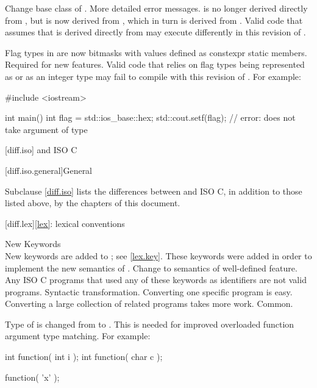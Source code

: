 \change
Change base class of .
\rationale
More detailed error messages.
\effect
{} is no longer derived directly from
, but is now derived from ,
which in turn is derived from . Valid \CppIII{} code
that assumes that  is derived directly from
 may execute differently in this revision of \Cpp{}.

\change
Flag types in  are now bitmasks with values
defined as constexpr static members.
\rationale
Required for new features.
\effect
Valid \CppIII{} code that relies on  flag types being
represented as  or as an integer type may fail to compile
with this revision of \Cpp{}. For example:
\begin{codeblock}
#include <iostream>

int main() {
  int flag = std::ios_base::hex;
  std::cout.setf(flag);         // error:  does not take argument of type 
}
\end{codeblock}

[diff.iso]{\Cpp{} and ISO C}

[diff.iso.general]{General}

\pnum
{}%
Subclause \ref{diff.iso} lists the differences between \Cpp{} and ISO C,
in addition to those listed above,
by the chapters of this document.

[diff.lex]{\ref{lex}: lexical conventions}

\change
New Keywords\\
New keywords are added to \Cpp{};
see \ref{lex.key}.
\rationale
These keywords were added in order to implement the new
semantics of \Cpp{}.
\effect
Change to semantics of well-defined feature.
Any ISO C programs that used any of these keywords as identifiers
are not valid \Cpp{} programs.
\difficulty
Syntactic transformation.
Converting one specific program is easy.
Converting a large collection
of related programs takes more work.
\howwide
Common.

\change
Type of  is changed from  to .
\rationale
This is needed for improved overloaded function argument type
matching.
For example:

\begin{codeblock}
int function( int i );
int function( char c );

function( 'x' );
\end{codeblock}

